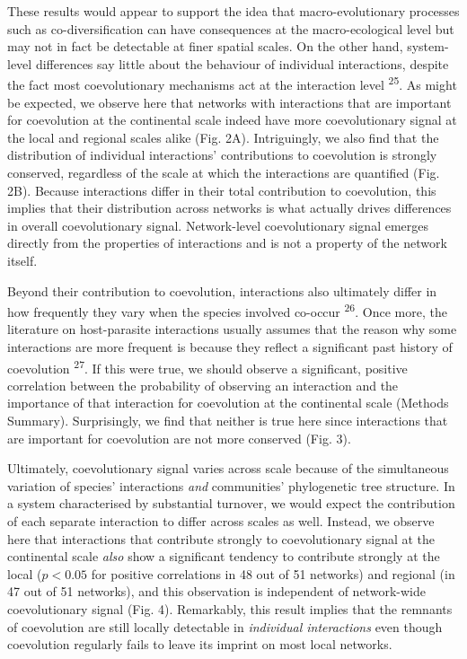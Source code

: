 \documentclass{nature}
\begin{document}
These results would appear to support the idea that macro-evolutionary
processes such as co-diversification can have consequences at the
macro-ecological level but may not in fact be detectable at finer spatial
scales. On the other hand, system-level differences say little about the
behaviour of individual interactions, despite the fact most coevolutionary
mechanisms act at the interaction level \textsuperscript{25}. As might be
expected, we observe here that networks with interactions that are important
for coevolution at the continental scale indeed have more coevolutionary signal
at the local and regional scales alike (Fig. 2A). Intriguingly, we also find
that the distribution of individual interactions' contributions to coevolution
is strongly conserved, regardless of the scale at which the interactions are
quantified (Fig. 2B). Because interactions differ in their total contribution
to coevolution, this implies that their distribution across networks is what
actually drives differences in overall coevolutionary signal. Network-level
coevolutionary signal emerges directly from the properties of interactions
and is not a property of the network itself.

Beyond their contribution to coevolution, interactions also ultimately
differ in how frequently they vary when the species involved co-occur
\textsuperscript{26}. Once more, the literature on host-parasite
interactions usually assumes that the reason why some interactions are more
frequent is because they reflect a significant past history of coevolution
\textsuperscript{27}. If this were true, we should observe a significant,
positive correlation between the probability of observing an interaction and
the importance of that interaction for coevolution at the continental scale
(Methods Summary). Surprisingly, we find that neither is true here since
interactions that are important for coevolution are not more conserved
(Fig. 3).

Ultimately, coevolutionary signal varies across scale because of the
simultaneous variation of species' interactions \emph{and} communities'
phylogenetic tree structure. In a system characterised by substantial turnover,
we would expect the contribution of each separate interaction to differ across
scales as well. Instead, we observe here that interactions that contribute
strongly to coevolutionary signal at the continental scale \emph{also} show a
significant tendency to contribute strongly at the local ($p<0.05$ for positive
correlations in 48 out of 51 networks) and regional (in 47 out of 51 networks),
and this observation is independent of network-wide coevolutionary signal
(Fig.  4). Remarkably, this result implies that the remnants of coevolution
are still locally detectable in \emph{individual interactions} even though
coevolution regularly fails to leave its imprint on most local networks.
\end{document}
